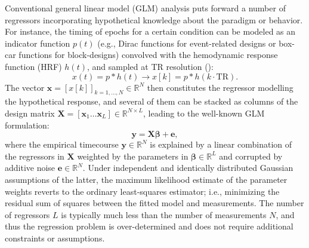 Conventional general linear model (GLM) analysis puts forward a number of regressors incorporating hypothetical knowledge about the paradigm or behavior. For instance, the timing of epochs for a certain condition can be modeled as an indicator function $p(t)$ (e.g., Dirac functions for event-related designs or box-car functions for block-designs) convolved with the hemodynamic response function (HRF) $h(t)$, and sampled at TR resolution (\citealt{Friston1994AnalysisfunctionalMRI,Friston1998EventRelatedfMRI,Boynton1996LinearSystemsAnalysis,Cohen1997ParametricAnalysisfMRI}):
$$
   x(t) = p*h(t) \rightarrow x[k] = p*h(k\cdot\text{TR}).
$$
The vector $\mathbf{x}=[x[k]]_{k=1,\ldots,N}  \in \mathbb{R}^{N}$ then constitutes the regressor modelling the hypothetical response, and several of them can be stacked as columns of the design matrix $\mathbf{X}=[\mathbf{x}_1 \ldots \mathbf{x}_L] \in \mathbb{R}^{N \times L}$, leading to the well-known GLM formulation: 
\begin{equation}
    \label{eq:glm}
    \mathbf{y} = \mathbf{X} \boldsymbol\beta + \mathbf{e},
\end{equation}
where the empirical timecourse $\mathbf{y} \in \mathbb{R}^{N}$ is explained by a linear combination of the regressors in $\mathbf{X}$ weighted by the parameters in $\boldsymbol\beta \in \mathbb{R}^{L}$ and corrupted by additive noise $\mathbf{e}\in \mathbb{R}^{N}$. Under independent and identically distributed Gaussian assumptions of the latter, the maximum likelihood estimate of the parameter weights reverts to the ordinary least-squares estimator; i.e., minimizing the residual sum of squares between the fitted model and measurements. The number of regressors $L$ is typically much less than the number of measurements $N$, and thus the regression problem is over-determined and does not require additional constraints or assumptions.

